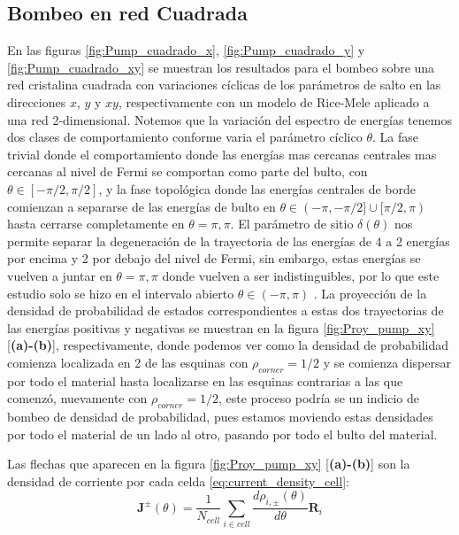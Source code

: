 

\subsection{Bombeo en red Cuadrada}

En las figuras \ref{fig:Pump_cuadrado_x}, \ref{fig:Pump_cuadrado_y} y \ref{fig:Pump_cuadrado_xy} se muestran los resultados para el bombeo sobre una red cristalina cuadrada con variaciones cíclicas de los parámetros de salto en las direcciones $x$, $y$ y $xy$, respectivamente con un modelo de Rice-Mele aplicado a una red 2-dimensional. Notemos que la variación del espectro de energías tenemos dos clases de comportamiento conforme varia el parámetro cíclico $\theta$. La fase trivial donde el comportamiento donde las energías mas cercanas centrales mas cercanas al nivel de Fermi se comportan como parte del bulto, con $\theta \in [-\pi/2, \pi/2]$, y la fase topológica donde las energías centrales de borde comienzan a separarse de las energías de bulto en $\theta \in (-\pi,-\pi/2] \cup [\pi/2,\pi)$ hasta cerrarse completamente en $\theta = \pi,\pi$. El parámetro de sitio $\delta(\theta)$ nos permite separar la degeneración de la trayectoria de las energías de 4 a 2 energías por encima y 2 por debajo del nivel de Fermi, sin embargo, estas energías se vuelven a juntar en $\theta = \pi,\pi$ donde vuelven a ser indistinguibles, por lo que este estudio solo se hizo en el intervalo abierto $\theta \in (-\pi,\pi)$ . 
La proyección de la densidad de probabilidad de estados correspondientes a estas dos trayectorias de las energías positivas y negativas se muestran en la figura \ref{fig:Proy_pump_xy} [\textbf{(a)-(b)}], respectivamente, donde podemos ver como la densidad de probabilidad comienza localizada en 2 de las esquinas con $\rho_{corner} = 1/2$ y se comienza dispersar por todo el material hasta localizarse en las esquinas contrarias a las que comenzó, nuevamente con $\rho_{corner} = 1/2$, este proceso podría se un indicio de bombeo de densidad de probabilidad, pues estamos moviendo estas densidades por todo el material de un lado al otro, pasando por todo el bulto del material. 

Las flechas que aparecen en la figura \ref{fig:Proy_pump_xy} [\textbf{(a)-(b)}] son la densidad de corriente por cada celda \ref{eq:current_density_cell}:
\begin{equation}
    \label{eq:current_density_cell}
    \mathbf{J}^{\pm}(\theta) = \frac{1}{N_{cell}}\sum_{i \in cell} \frac{d \rho_{i,\pm}(\theta)}{d\theta} \mathbf{R}_i  
\end{equation}

